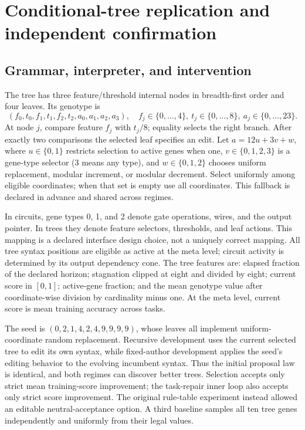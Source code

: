 \section{Conditional-tree replication and independent confirmation}\label{app:trees}
\subsection{Grammar, interpreter, and intervention}
The tree has three feature/threshold internal nodes in breadth-first order and four leaves. Its genotype is
\[
 (f_0,t_0,f_1,t_1,f_2,t_2,a_0,a_1,a_2,a_3),
 \quad f_j\in\{0,\ldots,4\},\ t_j\in\{0,\ldots,8\},\ a_j\in\{0,\ldots,23\}.
\]
At node $j$, compare feature $f_j$ with $t_j/8$; equality selects the right branch. After exactly two comparisons the selected leaf specifies an edit. Let $a=12u+3v+w$, where $u\in\{0,1\}$ restricts selection to active genes when one, $v\in\{0,1,2,3\}$ is a gene-type selector (3 means any type), and $w\in\{0,1,2\}$ chooses uniform replacement, modular increment, or modular decrement. Select uniformly among eligible coordinates; when that set is empty use all coordinates. This fallback is declared in advance and shared across regimes.

In circuits, gene types 0, 1, and 2 denote gate operations, wires, and the output pointer. In trees they denote feature selectors, thresholds, and leaf actions. This mapping is a declared interface design choice, not a uniquely correct mapping. All tree syntax positions are eligible as active at the meta level; circuit activity is determined by its output dependency cone. The tree features are: elapsed fraction of the declared horizon; stagnation clipped at eight and divided by eight; current score in $[0,1]$; active-gene fraction; and the mean genotype value after coordinate-wise division by cardinality minus one. At the meta level, current score is mean training accuracy across tasks.

The seed is $(0,2,1,4,2,4,9,9,9,9)$, whose leaves all implement uniform-coordinate random replacement. Recursive development uses the current selected tree to edit its own syntax, while fixed-author development applies the seed's editing behavior to the evolving incumbent syntax. Thus the initial proposal law is identical, and both regimes can discover better trees. Selection accepts only strict mean training-score improvement; the task-repair inner loop also accepts only strict score improvement. The original rule-table experiment instead allowed an editable neutral-acceptance option. A third baseline samples all ten tree genes independently and uniformly from their legal values.

